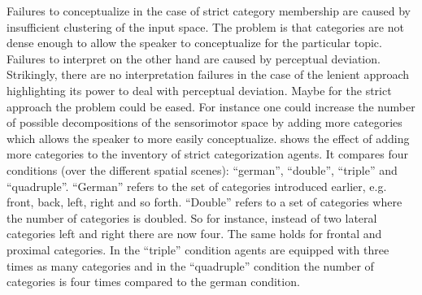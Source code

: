 Failures to conceptualize in the case of strict category membership are caused by 
insufficient clustering of the input space. The problem is that categories are not
dense enough to allow the speaker to conceptualize for the particular topic.
Failures to interpret on the other hand are caused by perceptual deviation.
Strikingly, there are no interpretation failures in the case of the lenient approach
highlighting its power to deal with perceptual deviation. Maybe for the strict
approach the problem could be eased. For instance one could increase
the number of possible decompositions of the sensorimotor space
by adding more categories which allows the speaker to more easily conceptualize.
 shows the effect of 
adding more categories to the inventory of strict categorization agents.
It compares four conditions (over the different spatial scenes):
``german'', ``double'', ``triple'' and ``quadruple''.
``German'' refers to the set of categories introduced earlier, e.g. front, back, left, 
right and so forth. ``Double'' refers to a set of categories where the number of 
categories is doubled. So for instance, instead of two lateral categories left and right 
there are now four. The same holds for frontal and proximal categories. In the ``triple'' 
condition agents are equipped with three times as many categories and in the\enlargethispage{1\baselineskip}
``quadruple'' condition the number of categories is four times compared to the 
german condition. 

